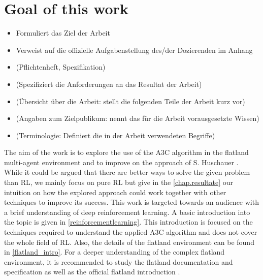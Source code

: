 \section{Goal of this work}\label{zielsetzung}
\begin{itemize}
\item Formuliert das Ziel der Arbeit
\item Verweist auf die offizielle Aufgabenstellung des/der Dozierenden im Anhang
\item (Pflichtenheft, Spezifikation)
\item (Spezifiziert die Anforderungen an das Resultat der Arbeit)
\item (Übersicht über die Arbeit: stellt die folgenden Teile der Arbeit kurz vor)
\item (Angaben zum Zielpublikum: nennt das für die Arbeit vorausgesetzte Wissen)
\item (Terminologie: Definiert die in der Arbeit verwendeten Begriffe)
\end{itemize}
The aim of the work is to explore the use of the A3C algorithm in the flatland multi-agent environment and to improve on the approach of S. Huschauer \cite{flatlandstephan}.\\
While it could be argued that there are better ways to solve the given problem than RL, we mainly focus on pure RL but give in the \autoref{chap.resultate} our intuition on how the explored approach could work together with other techniques to improve its success.
This work is targeted towards an audience with a brief understanding of deep reinforcement learning. A basic introduction into the topic is given in \autoref{reinforcementlearning}. This introduction is focused on the techniques required to understand the applied A3C algorithm and does not cover the whole field of RL.
Also, the details of the flatland environment can be found in \autoref{flatland_intro}. For a deeper understanding of the complex flatland environment, it is recommended to study the flatland documentation and specification \cite{flatland_docu} as well as the official flatland introduction \cite{aicrowd}.
